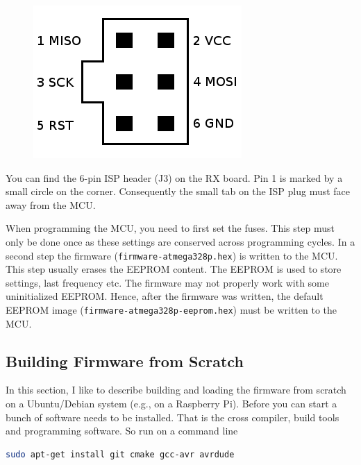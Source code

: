 \documentclass[10pt, a4paper,twoside]{scrartcl}
\begin{document}
\begin{figure}
  \includegraphics[width=\linewidth]{fig/icsp_6pin.png}
\end{figure}
You can find the 6-pin ISP header (J3) on the RX board. Pin 1 is marked by a small circle on the corner. Consequently the small tab on the ISP plug must face away from the MCU. 

When programming the MCU, you need to first set the fuses. This step must only be done once as these settings are conserved across programming cycles. In a second step the firmware (\texttt{firmware-atmega328p.hex}) is written to the MCU. This step usually erases the EEPROM content. The EEPROM is used to store settings, last frequency etc. The firmware may not properly work with some uninitialized EEPROM. Hence, after the firmware was written, the default EEPROM image (\texttt{firmware-atmega328p-eeprom.hex}) must be written to the MCU.

\subsection{Building Firmware from Scratch}
In this section, I like to describe building and loading the firmware from scratch on a Ubuntu/Debian system (e.g., on a Raspberry Pi). Before you can start a bunch of software needs to be installed. That is the cross compiler, build tools and programming software. So run on a command line
\begin{lstlisting}[language=bash]
sudo apt-get install git cmake gcc-avr avrdude
\end{lstlisting}
\end{document}
